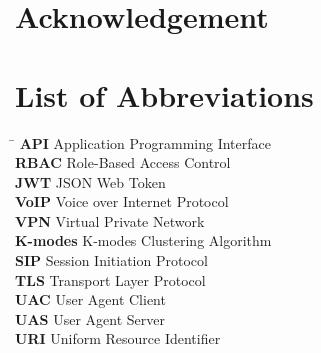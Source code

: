 \documentclass{article}
\begin{document}


\renewcommand{\listfigurename}{LIST OF FIGURES}
\renewcommand{\cftloftitlefont}{\Large\bfseries} 
\renewcommand{\cftafterloftitle}{
    \par\noindent\vspace{-0.5em}
    \textcolor{blue}{\rule{\textwidth}{0.5pt}}
    \vspace{1em} 
}
\renewcommand{\cftfigpresnum}{Figure~}
\renewcommand{\cftfigaftersnum}{:}
\setlength{\cftfignumwidth}{5em}


\renewcommand{\contentsname}{\centering TABLE OF CONTENTS}
\begin{center}
    \tableofcontents
\end{center}
\newpage

\section*{Acknowledgement}

\newpage
\vspace{2em}
\section*{List of Abbreviations}

\begin{tabbing}
    \hspace{4cm} \= \hspace{10cm} \kill
    \textbf{API} \> Application Programming Interface \\
    \textbf{RBAC} \> Role-Based Access Control \\
    \textbf{JWT} \> JSON Web Token \\
    \textbf{VoIP} \> Voice over Internet Protocol \\
    \textbf{VPN} \> Virtual Private Network \\
    \textbf{K-modes} \> K-modes Clustering Algorithm \\
    \textbf{SIP} \> Session Initiation Protocol \\
    \textbf{TLS} \> Transport Layer Protocol \\
    \textbf{UAC} \> User Agent Client \\
    \textbf{UAS} \> User Agent Server \\
    \textbf{URI} \> Uniform Resource Identifier \\
\end{tabbing}
\end{document}
